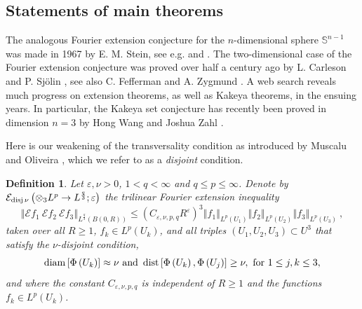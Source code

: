\documentclass{amsart}%
\theoremstyle{plain}
\newtheorem{definition}[theorem]{Definition}
\numberwithin{equation}{section}
\begin{document}
\subsection{Statements of main theorems}

The analogous Fourier extension conjecture for the $n$-dimensional sphere
$\mathbb{S}^{n-1}$ was made in 1967 by E. M. Stein, see e.g. \cite[see the
Notes at the end of Chapter IX, p. 432, where Stein proved the restriction
conjecture for $1\leq p<\frac{4n}{3n+1}$]{Ste2} and \cite{Ste}. The
two-dimensional case of the Fourier extension conjecture was proved over half
a century ago by L. Carleson and P. Sj\"{o}lin \cite{CaSj}, see also C.
Fefferman \cite{Fef} and A. Zygmund \cite{Zyg}. A web search reveals much
progress on extension theorems, as well as Kakeya theorems, in the ensuing
years. In particular, the Kakeya set conjecture has recently been proved in
dimension $n=3$ by Hong Wang and Joshua Zahl \cite{WaZa}.

Here is our weakening of the transversality condition as introduced by Muscalu
and Oliveira \cite{MuOl}, which we refer to as a \emph{disjoint} condition.

\begin{definition}
Let $\varepsilon,\nu>0$, $1<q<\infty$ and $q\leq p\leq\infty$. Denote by
$\mathcal{E}_{\mathop{\rm disj}\nu}\left(  \otimes_{3}L^{p}\rightarrow
L^{\frac{q}{3}};\varepsilon\right)  $ the trilinear Fourier extension
inequality%
\begin{equation}
\left\Vert \mathcal{E}f_{1}\ \mathcal{E}f_{2}\ \mathcal{E}f_{3}\right\Vert
_{L^{\frac{q}{3}}\left(  B\left(  0,R\right)  \right)  }\leq\left(
C_{\varepsilon,\nu,p,q}R^{\varepsilon}\right)  ^{3}\left\Vert f_{1}\right\Vert
_{L^{p}\left(  U_{1}\right)  }\left\Vert f_{2}\right\Vert _{L^{p}\left(
U_{2}\right)  }\left\Vert f_{3}\right\Vert _{L^{p}\left(  U_{3}\right)
}\ ,\label{concl thm}%
\end{equation}
taken over all $R\geq1$, $f_{k}\in L^{p}\left(  U_{k}\right)  $, and all
triples $\left(  U_{1},U_{2},U_{3}\right)  \subset U^{3}$ that satisfy the
$\nu$-disjoint condition,%
\begin{equation}
\mathop{\rm diam}\left[  \Phi\left(  U_{k}\right)  \right]  \approx\nu\text{
and }\mathop{\rm dist}\left[  \Phi\left(  U_{k}\right)  ,\Phi\left(
U_{j}\right)  \right]  \geq\nu,\text{ for }1\leq j,k\leq3,\label{weak sep}%
\end{equation}
and where the constant $C_{\varepsilon,\nu,p,q}$ is independent of $R\geq1 $
and the functions $f_{k}\in L^{p}\left(  U_{k}\right)  $.
\end{definition}
\end{document}
